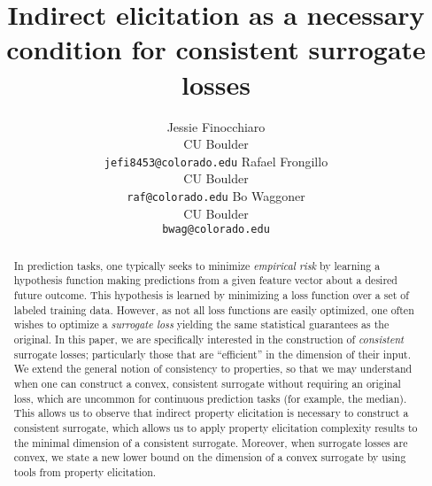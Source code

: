 \documentclass{article}
\title{Indirect elicitation as a necessary condition for consistent surrogate losses}
\author{%
  Jessie Finocchiaro\\
  CU Boulder\\
  \texttt{jefi8453@colorado.edu} 
  \And
   Rafael Frongillo\\
   CU Boulder\\
   \texttt{raf@colorado.edu} 
   \And
   Bo Waggoner\\
   CU Boulder \\
   \texttt{bwag@colorado.edu} 
}
\begin{document}
\maketitle

\begin{abstract}
	In prediction tasks, one typically seeks to minimize \emph{empirical risk} by learning a hypothesis function making predictions from a given feature vector about a desired future outcome.
	This hypothesis is learned by minimizing a loss function over a set of labeled training data.
	However, as not all loss functions are easily optimized, one often wishes to optimize a \emph{surrogate loss} yielding the same statistical guarantees as the original.
	In this paper, we are specifically interested in the construction of \emph{consistent} surrogate losses; particularly those that are  ``efficient'' in the dimension of their input.
	We extend the general notion of consistency to properties, so that we may understand when one can construct a convex, consistent surrogate without requiring an original loss, which are uncommon for continuous prediction tasks (for example, the median).
	This allows us to observe that indirect property elicitation is necessary to construct a consistent surrogate, which allows us to apply property elicitation complexity results to the minimal dimension of a consistent surrogate.
	Moreover, when surrogate losses are convex, we state a new lower bound on the dimension of a convex surrogate by using tools from property elicitation.
\end{abstract}
\end{document}
